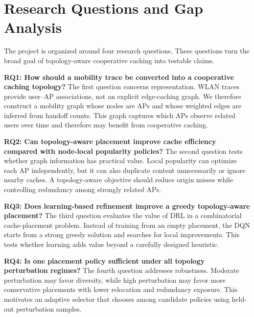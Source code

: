 \section{Research Questions and Gap Analysis}

The project is organized around four research questions. These questions turn the broad goal of topology-aware cooperative caching into testable claims.

\textbf{RQ1: How should a mobility trace be converted into a cooperative caching topology?}
The first question concerns representation. WLAN traces provide user--AP associations, not an explicit edge-caching graph. We therefore construct a mobility graph whose nodes are APs and whose weighted edges are inferred from handoff counts. This graph captures which APs observe related users over time and therefore may benefit from cooperative caching.

\textbf{RQ2: Can topology-aware placement improve cache efficiency compared with node-local popularity policies?}
The second question tests whether graph information has practical value. Local popularity can optimize each AP independently, but it can also duplicate content unnecessarily or ignore nearby caches. A topology-aware objective should reduce origin misses while controlling redundancy among strongly related APs.

\textbf{RQ3: Does learning-based refinement improve a greedy topology-aware placement?}
The third question evaluates the value of DRL in a combinatorial cache-placement problem. Instead of training from an empty placement, the DQN starts from a strong greedy solution and searches for local improvements. This tests whether learning adds value beyond a carefully designed heuristic.

\textbf{RQ4: Is one placement policy sufficient under all topology perturbation regimes?}
The fourth question addresses robustness. Moderate perturbation may favor diversity, while high perturbation may favor more conservative placements with lower relocation and redundancy exposure. This motivates an adaptive selector that chooses among candidate policies using held-out perturbation samples.

